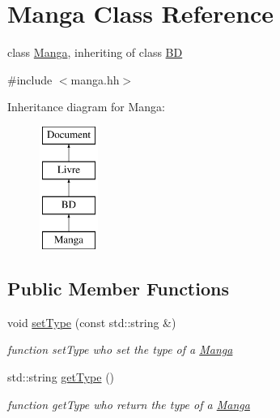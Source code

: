\hypertarget{classManga}{
\section{Manga Class Reference}
\label{classManga}
}


class \hyperlink{classManga}{Manga}, inheriting of class \hyperlink{classBD}{BD}  




{\ttfamily \#include $<$manga.hh$>$}

Inheritance diagram for Manga:\begin{figure}[H]
\begin{center}
\leavevmode
\includegraphics[height=4.000000cm]{classManga}
\end{center}
\end{figure}
\subsection*{Public Member Functions}
\begin{DoxyCompactItemize}
\item 
\hypertarget{classManga_a716ba88e31bc424d5508014887b6e019}{
void \hyperlink{classManga_a716ba88e31bc424d5508014887b6e019}{setType} (const std::string \&)}
\label{classManga_a716ba88e31bc424d5508014887b6e019}

\begin{DoxyCompactList}\small\item\em function setType who set the type of a \hyperlink{classManga}{Manga} \item\end{DoxyCompactList}\item 
\hypertarget{classManga_a3129c402dc72b73770ab9a0cc21b40f9}{
std::string \hyperlink{classManga_a3129c402dc72b73770ab9a0cc21b40f9}{getType} ()}
\label{classManga_a3129c402dc72b73770ab9a0cc21b40f9}

\begin{DoxyCompactList}\small\item\em function getType who return the type of a \hyperlink{classManga}{Manga} \item\end{DoxyCompactList}\end{DoxyCompactItemize}
